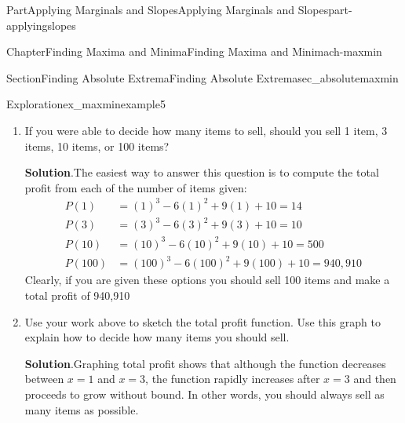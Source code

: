 \documentclass{tufte-book}
\newcommand{\blocktitlefont}{\relax}
\numberwithin{equation}{chapter}
\newcommand{\amp}{&}
\begin{document}
\begin{partptx}{Part}{Applying Marginals and Slopes}{}{Applying Marginals and Slopes}{}{}{part-applyingslopes}
\begin{chapterptx}{Chapter}{Finding Maxima and Minima}{}{Finding Maxima and Minima}{}{}{ch-maxmin}
\begin{sectionptx}{Section}{Finding Absolute Extrema}{}{Finding Absolute Extrema}{}{}{sec_absolutemaxmin}
\begin{exploration}{Exploration}{}{ex_maxminexample5}
\begin{enumerate}[font=\bfseries,label=(\alph*),ref=\alph*]
\begin{image}{0.25}{0.5}{0.25}{}
{\begin{tikzpicture}
\end{tikzpicture}
}%
\end{image}%
%
\par
According to this analysis, a local maximum of profit occurs at \(x=1\), and a local minimum occurs at \(x=3\).%
\item{}If you were able to decide how many items to sell, should you sell 1 item, 3 items, 10 items, or 100 items?%
\par\smallskip%
\noindent\textbf{\blocktitlefont Solution}.\hypertarget{ex_maxminexample5-3-2}{}\quad{}The easiest way to answer this question is to compute the total profit from each of the number of items given:%
\begin{align*}
P(1) \amp = (1)^3 - 6(1)^2 + 9(1) + 10 = 14\\
P(3) \amp = (3)^3 - 6(3)^2 + 9(3) + 10 = 10\\
P(10) \amp = (10)^3 - 6(10)^2 + 9(10) + 10 = 500\\
P(100) \amp = (100)^3 - 6(100)^2 + 9(100) + 10 = 940,910
\end{align*}
Clearly, if you are given these options you should sell 100 items and make a total profit of \textdollar{}940,910%
\item{}Use your work above to sketch the total profit function.  Use this graph to explain how to decide how many items you should sell.%
\par\smallskip%
\noindent\textbf{\blocktitlefont Solution}.\hypertarget{ex_maxminexample5-4-2}{}\quad{}Graphing total profit shows that although the function decreases between \(x=1\) and \(x=3\), the function rapidly increases after \(x=3\) and then proceeds to grow without bound. In other words, you should always sell as many items as possible.%
\par
\begin{image}{0.25}{0.5}{0.25}{}%
\end{image}
\end{enumerate}
\end{exploration}
\end{sectionptx}
\end{chapterptx}
\end{partptx}
\end{document}
